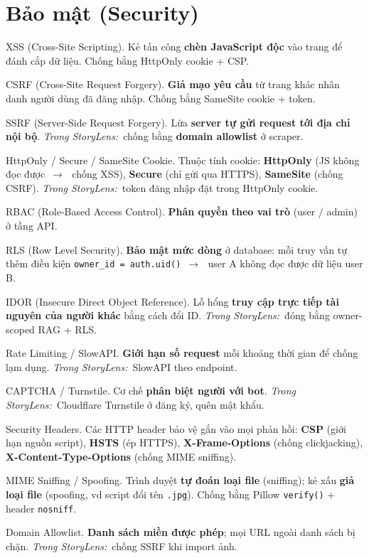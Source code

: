 \documentclass[11pt]{article}
\newcommand{\arr}{\,\ensuremath{\rightarrow}\,}
\newcommand{\code}[1]{\texttt{\small #1}}
\newcommand{\insl}{\textit{\textcolor{steel}{Trong StoryLens:}}\ }
\begin{document}
\section{Bảo mật (Security)}
\begin{terms}
\item[XSS (Cross-Site Scripting).] Kẻ tấn công \textbf{chèn JavaScript độc} vào trang để đánh cắp dữ liệu. Chống bằng HttpOnly cookie + CSP.
\item[CSRF (Cross-Site Request Forgery).] \textbf{Giả mạo yêu cầu} từ trang khác nhân danh người dùng đã đăng nhập. Chống bằng SameSite cookie + token.
\item[SSRF (Server-Side Request Forgery).] Lừa \textbf{server tự gửi request tới địa chỉ nội bộ}. \insl chống bằng \textbf{domain allowlist} ở scraper.
\item[HttpOnly / Secure / SameSite Cookie.] Thuộc tính cookie: \textbf{HttpOnly} (JS không đọc được \arr\ chống XSS), \textbf{Secure} (chỉ gửi qua HTTPS), \textbf{SameSite} (chống CSRF). \insl token đăng nhập đặt trong HttpOnly cookie.
\item[RBAC (Role-Based Access Control).] \textbf{Phân quyền theo vai trò} (user / admin) ở tầng API.
\item[RLS (Row Level Security).] \textbf{Bảo mật mức dòng} ở database: mỗi truy vấn tự thêm điều kiện \code{owner\_id = auth.uid()} \arr\ user A không đọc được dữ liệu user B.
\item[IDOR (Insecure Direct Object Reference).] Lỗ hổng \textbf{truy cập trực tiếp tài nguyên của người khác} bằng cách đổi ID. \insl đóng bằng owner-scoped RAG + RLS.
\item[Rate Limiting / SlowAPI.] \textbf{Giới hạn số request} mỗi khoảng thời gian để chống lạm dụng. \insl SlowAPI theo endpoint.
\item[CAPTCHA / Turnstile.] Cơ chế \textbf{phân biệt người với bot}. \insl Cloudflare Turnstile ở đăng ký, quên mật khẩu.
\item[Security Headers.] Các HTTP header bảo vệ gắn vào mọi phản hồi: \textbf{CSP} (giới hạn nguồn script), \textbf{HSTS} (ép HTTPS), \textbf{X-Frame-Options} (chống clickjacking), \textbf{X-Content-Type-Options} (chống MIME sniffing).
\item[MIME Sniffing / Spoofing.] Trình duyệt \textbf{tự đoán loại file} (sniffing); kẻ xấu \textbf{giả loại file} (spoofing, vd script đổi tên \code{.jpg}). Chống bằng Pillow \code{verify()} + header \code{nosniff}.
\item[Domain Allowlist.] \textbf{Danh sách miền được phép}; mọi URL ngoài danh sách bị chặn. \insl chống SSRF khi import ảnh.

\end{terms}
\end{document}
